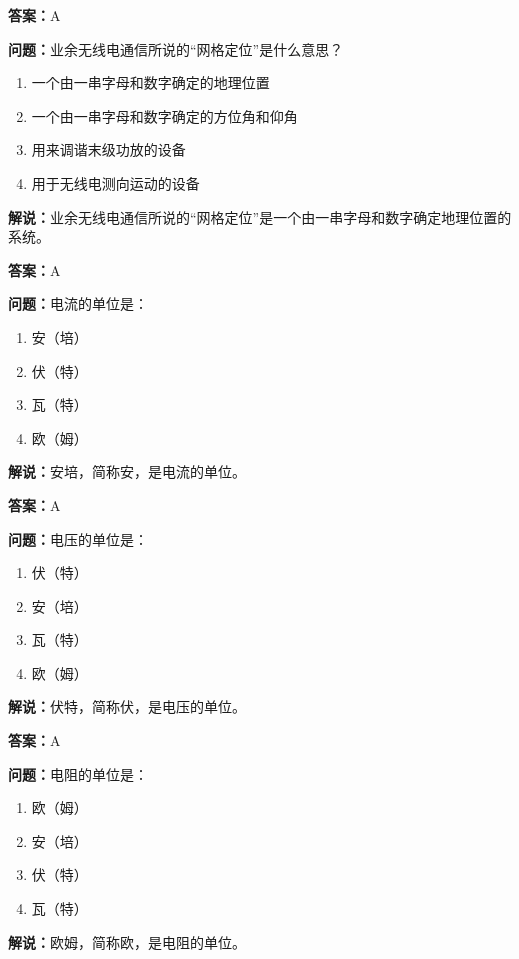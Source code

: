 \documentclass[UTF8]{ctexbook}
\begin{document}
\textbf{答案：}A

\textbf{问题：}业余无线电通信所说的“网格定位”是什么意思？

\begin{enumerate}[label=\Alph*), leftmargin=3em]
  \item 一个由一串字母和数字确定的地理位置
  \item 一个由一串字母和数字确定的方位角和仰角
  \item 用来调谐末级功放的设备
  \item 用于无线电测向运动的设备
\end{enumerate}

\textbf{解说：}业余无线电通信所说的“网格定位”是一个由一串字母和数字确定地理位置的系统。

\textbf{答案：}A

\textbf{问题：}电流的单位是：

\begin{enumerate}[label=\Alph*), leftmargin=3em]
  \item 安（培）
  \item 伏（特）
  \item 瓦（特）
  \item 欧（姆）
\end{enumerate}

\textbf{解说：}安培，简称安，是电流的单位。

\textbf{答案：}A

\textbf{问题：}电压的单位是：

\begin{enumerate}[label=\Alph*), leftmargin=3em]
  \item 伏（特）
  \item 安（培）
  \item 瓦（特）
  \item 欧（姆）
\end{enumerate}

\textbf{解说：}伏特，简称伏，是电压的单位。

\textbf{答案：}A

\textbf{问题：}电阻的单位是：

\begin{enumerate}[label=\Alph*), leftmargin=3em]
  \item 欧（姆）
  \item 安（培）
  \item 伏（特）
  \item 瓦（特）
\end{enumerate}

\textbf{解说：}欧姆，简称欧，是电阻的单位。
\end{document}
